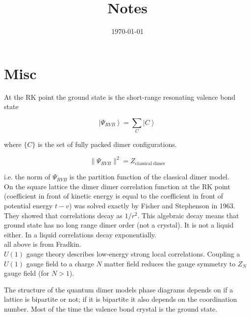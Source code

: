\documentclass[aps,floatfix,11pt]{revtex4-1}
\begin{document}
\title{Notes}

\date{\today}

\begin{abstract}
    
\end{abstract}

\maketitle 

\section{Misc}
At the RK point the ground state is the short-range resonating valence bond state

\begin{equation}
    \label{}
    \left| \Psi_{RVB} \right\rangle = \sum_{C} \left| C \right\rangle
\end{equation}
    
\noindent
where $\{C\}$ is the set of fully packed dimer configurations.

\begin{equation}
    \label{}
    \| \Psi_{RVB} \|^2 = Z_{\mathrm{classical\ dimer}}
\end{equation}

i.e. the norm of $\Psi_{RVB}$ is the partition function of the classical dimer model.
\\
On the square lattice the dimer dimer correlation function at the RK point (coefficient in front of
kinetic energy is equal to the coefficient in front of potential energy $t-v$) was solved exactly by Fisher and
Stephenson in 1963. They showed that correlations decay as $1/r^2$. This algebraic decay means that
ground state has no long
range dimer order (not a crystal). It is not a liquid either. In a liquid correlations decay
exponentially. 
\\
all above is from Fradkin.
\\

$U(1)$ gauge theory describes low-energy strong local correlations.
Coupling a $U(1)$ gauge field to a charge $N$ matter field reduces the gauge symmetry to $Z_N$ gauge
field (for $N>1$). 

The structure of the quantum dimer models phase diagrams depends on if a lattice is bipartite or
not; if it is bipartite it also depends on the coordination number. Most of the time the valence
bond crystal is the ground state.
\end{document}
